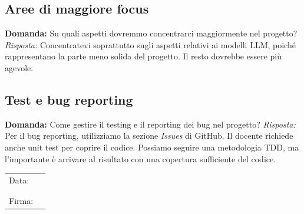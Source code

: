 \documentclass{article}
\begin{document}
\subsection{Aree di maggiore focus} \textbf{Domanda:} Su quali aspetti dovremmo concentrarci maggiormente nel progetto?
\newline
\textit{Risposta:} Concentratevi soprattutto sugli aspetti relativi ai modelli LLM, poiché rappresentano la parte meno solida del progetto. Il resto dovrebbe essere più agevole.

\subsection{Test e bug reporting} \textbf{Domanda:} Come gestire il testing e il reporting dei bug nel progetto?
\newline
\textit{Risposta:} Per il bug reporting, utilizziamo la sezione \textit{Issues} di GitHub. Il docente richiede anche unit test per coprire il codice. Possiamo seguire una metodologia TDD, ma l'importante è arrivare al risultato con una copertura sufficiente del codice.

\begin{table}[b]
	\begin{tabular}{@{}p{.5in}p{4in}@{}}
		Data:  & \hrulefill \\
			   &     		\\
			   &     		\\
		Firma: & \hrulefill \\
	\end{tabular}
	\end{table}
\end{document}
